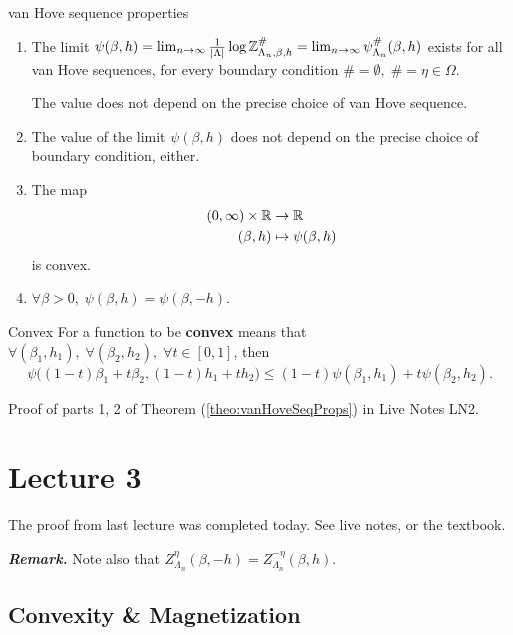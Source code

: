 \documentclass{article}
\begin{document}
\begin{Theorem}{van Hove sequence properties}{}\label{theo:vanHoveSeqProps}
  \begin{enumerate}
  \item The limit $\psi(\beta, h) = \lim_{n \rightarrow \infty} \frac{1}{\left| \Lambda \right|} \log \mathbb{Z}^{\#}_{\Lambda_n, \beta, h} = \lim_{n \rightarrow \infty} \psi_{\Lambda_n}^{\#}(\beta, h)$ exists for all van Hove sequences, for every boundary condition $\# = \emptyset, \; \# = \eta \in \Omega$.

    The value does not depend on the precise choice of van Hove sequence.
    \item The value of the limit $\psi(\beta, h)$ does not depend on the precise choice of boundary condition, either.
    \item The map 
    \begin{align}
    \label{eq:9}
      (0, \infty) \times \mathbb{R} &\rightarrow \mathbb{R} \\
      (\beta, h) &\mapsto \psi(\beta, h)
    \end{align}
    is convex.
  \item $\forall \beta > 0, \; \psi(\beta, h) = \psi(\beta, -h)$.
  \end{enumerate}
\end{Theorem}

\begin{Definition}{Convex}{}\label{def:convex}
  For a function to be \textbf{convex} means that $\forall (\beta_1, h_1), \; \forall (\beta_2, h_2), \; \forall t \in [0, 1]$, then
\begin{equation}
  \psi\Big( (1 - t) \beta_1 + t \beta_2, (1 - t) h_1 + t h_2\Big) \leq (1 - t) \psi(\beta_1, h_1) + t \psi(\beta_2, h_2).
\end{equation}
\end{Definition}

Proof of parts 1, 2 of Theorem (\ref{theo:vanHoveSeqProps}) in Live Notes LN2.

\section{Lecture 3}

The proof from last lecture was completed today. See live notes, or the textbook.

\textbf{\textit{Remark.}} Note also that $Z_{\Lambda_n}^{\eta} (\beta, -h) = Z_{\Lambda_n}^{-\eta}(\beta, h)$.

\subsection{Convexity \& Magnetization}
\end{document}
